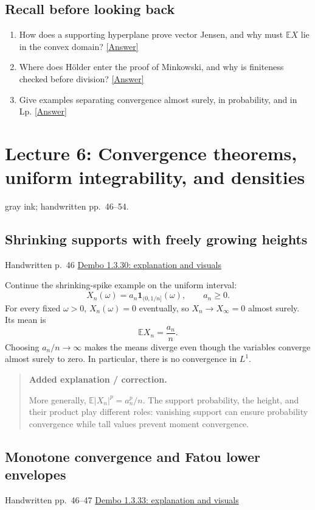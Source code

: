 \documentclass[11pt,letterpaper]{article}
\newcommand{\lecturesection}[1]{\subsection{#1}}
\begin{document}
\subsection*{Recall before looking back}
\begin{enumerate}
\item How does a supporting hyperplane prove vector Jensen, and why must $\mathbb E X$ lie in the convex domain? \hyperlink{answer-l5-s3}{[Answer]}
\item Where does Hölder enter the proof of Minkowski, and why is finiteness checked before division? \hyperlink{answer-l5-s6}{[Answer]}
\item Give examples separating convergence almost surely, in probability, and in Lp. \hyperlink{answer-l5-s10}{[Answer]}
\end{enumerate}

\clearpage
{}
\section{Lecture 6: Convergence theorems, uniform integrability, and densities}
{\small gray ink; handwritten pp.\ 46--54.}

\hypertarget{l6-s1}{}
\lecturesection{Shrinking supports with freely growing heights}
{\small\textcolor{lectureink}{Handwritten p.\ 46} \quad \href{https://josephrbailey.com/probability/\#entry-1-3-30}{Dembo 1.3.30: explanation and visuals}}

Continue the shrinking-spike example on the uniform interval: \[X_n(\omega)=a_n\mathbf1_{(0,1/n]}(\omega),\qquad a_n\ge0.\] For every fixed $\omega>0$, $X_n(\omega)=0$ eventually, so $X_n\to X_\infty=0$ almost surely. Its mean is \[\mathbb E X_n=\frac{a_n}{n}.\] Choosing $a_n/n\to\infty$ makes the means diverge even though the variables converge almost surely to zero. In particular, there is no convergence in $L^1$.

\begin{quote}\small\textbf{Added explanation / correction.}

More generally, $\mathbb E|X_n|^p=a_n^p/n$. The support probability, the height, and their product play different roles: vanishing support can ensure probability convergence while tall values prevent moment convergence.
\end{quote}

\hypertarget{l6-s2}{}
\lecturesection{Monotone convergence and Fatou lower envelopes}
{\small\textcolor{lectureink}{Handwritten pp.\ 46--47} \quad \href{https://josephrbailey.com/probability/\#entry-1-3-33}{Dembo 1.3.33: explanation and visuals}}
\end{document}

